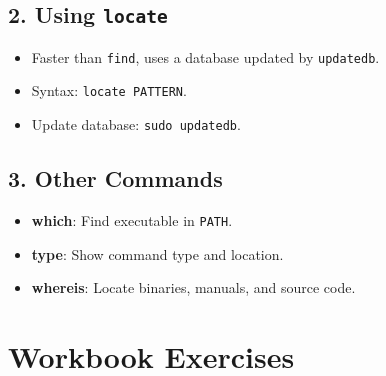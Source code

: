 \documentclass[a4paper]{report}
\begin{document}
\subsection*{2. Using \texttt{locate}}
\begin{itemize}
    \item Faster than \texttt{find}, uses a database updated by \texttt{updatedb}.
    \item Syntax: \texttt{locate PATTERN}.
    \item Update database: \texttt{sudo updatedb}.
\end{itemize}

\subsection*{3. Other Commands}
\begin{itemize}
    \item \textbf{which}: Find executable in \texttt{PATH}.
    \item \textbf{type}: Show command type and location.
    \item \textbf{whereis}: Locate binaries, manuals, and source code.
\end{itemize}

\section*{Workbook Exercises}
\end{document}
